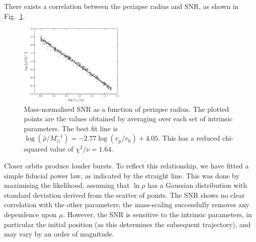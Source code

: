 \documentclass[useAMS,usedcolumn,usegraphicx,usenatbib]{mn2e}
\newcommand{\figref}[1]{Fig.~\ref{fig:#1}}
\newcommand{\sub}[1]{\ensuremath{_\mathrm{#1}}}
\begin{document}
There exists a correlation between the periapse radius and SNR, as shown in \figref{SNR}.
\begin{figure}
  \begin{center}
  \includegraphics[width=0.45\textwidth]{Fig_SNR}
    \caption{Mass-normalised SNR as a function of periapse radius. The plotted points are the values obtained by averaging over each set of intrinsic parameters. The best fit line is $\log\left(\hat{\rho}/M_\odot^{-1}\right) = -2.77\log(r\sub{p}/r\sub{S}) + 4.05$. This has a reduced chi-squared value of $\chi^2/\nu = 1.64$.}
    \label{fig:SNR}
  \end{center}
\end{figure}
Closer orbits produce louder bursts. To reflect this relationship, we have fitted a simple fiducial power law, as indicated by the straight line. This was done by maximising the likelihood, assuming that $\ln \rho$ has a Gaussian distribution with standard deviation derived from the scatter of points. The SNR shows no clear correlation with the other parameters; the mass-scaling successfully removes any dependence upon $\mu$. However, the SNR is sensitive to the intrinsic parameters, in particular the initial position (as this determines the subsequent trajectory), and may vary by an order of magnitude.
\end{document}
